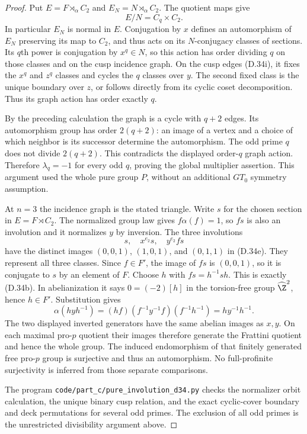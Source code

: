 \begin{proof}
Put $E=F\rtimes_\alpha C_2$ and
$E_N=N\rtimes_\alpha C_2$.  The quotient maps give
\[
                     E/N=C_q\times C_2.                 \tag{D.34k}
\]
In particular $E_N$ is normal in $E$.  Conjugation by
$x$ defines an automorphism of $E_N$ preserving its
map to $C_2$, and thus acts on its $N$-conjugacy
classes of sections.  Its $q$th power is conjugation
by $x^q\in N$, so this action has order dividing
$q$ on those classes and on the cusp incidence graph.
On the cusp edges (D.34i), it fixes the $x^q$ and
$z^q$ classes and cycles the $q$ classes over $y$.
The second fixed class is the unique boundary over
$z$, or follows directly from its cyclic coset
decomposition.  Thus its graph action has order
exactly $q$.

By the preceding calculation the graph is a cycle
with $q+2$ edges.  Its automorphism group has order
$2(q+2)$: an image of a vertex and a choice of which
neighbor is its successor determine the automorphism.
The odd prime $q$ does not divide $2(q+2)$.
This contradicts the displayed order-$q$ graph action.
Therefore $\lambda_q=-1$ for every odd $q$, proving
the global multiplier assertion.  This argument used
the whole pure group $P$, without an additional
$GT_0$ symmetry assumption.

At $n=3$ the incidence graph is the stated triangle.
Write $s$ for the chosen section in $E=F\rtimes C_2$.
The normalized group law gives $f\alpha(f)=1$,
so $fs$ is also an involution and it normalizes $y$
by inversion.  The three involutions
\[
                     s,\quad x^{e_2}s,\quad y^{e_2}fs
                                                        \tag{D.34l}
\]
have the distinct images $(0,0,1)$, $(1,0,1)$,
and $(0,1,1)$ in (D.34e).  They represent all three
classes.  Since $f\in F'$, the image of $fs$ is
$(0,0,1)$, so it is conjugate to $s$ by an element
of $F$.  Choose $h$ with $fs=h^{-1}sh$.  This is
exactly (D.34b).  In abelianization it says
$0=(-2)[h]$ in the torsion-free group
$\widehat\Z^2$, hence $h\in F'$.
Substitution gives
\[
 \alpha(hyh^{-1})
   =(hf)(f^{-1}y^{-1}f)(f^{-1}h^{-1})
   =hy^{-1}h^{-1}.
\]
The two displayed inverted generators have the same
abelian images as $x,y$.  On each maximal pro-$p$
quotient their images therefore generate the Frattini
quotient and hence the whole group.  The induced
endomorphism of that finitely generated free pro-$p$
group is surjective and thus an automorphism.
No full-profinite surjectivity is inferred from those
separate comparisons.

The program \texttt{code/part\_c/pure\_involution\_d34.py}
checks the normalizer orbit calculation, the unique
binary cusp relation, and the exact cyclic-cover
boundary and deck permutations for several odd
primes.  The exclusion of all odd primes is the
unrestricted divisibility argument above.
\end{proof}
